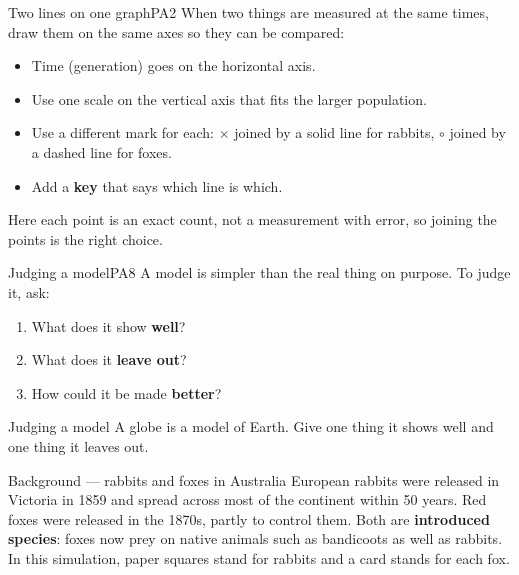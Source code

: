 
\begin{technique}{Two lines on one graph}{PA2}
When two things are measured at the same times, draw them on the same axes so they can be compared:
\begin{itemize}[leftmargin=1.4em, itemsep=1pt, topsep=3pt]
  \item Time (generation) goes on the horizontal axis.
  \item Use one scale on the vertical axis that fits the larger population.
  \item Use a different mark for each: $\times$ joined by a solid line for rabbits, $\circ$ joined by a dashed line for foxes.
  \item Add a \textbf{key} that says which line is which.
\end{itemize}
Here each point is an exact count, not a measurement with error, so joining the points is the right choice.
\end{technique}

\begin{technique}{Judging a model}{PA8}
A model is simpler than the real thing on purpose. To judge it, ask:
\begin{enumerate}[leftmargin=1.6em, itemsep=1pt, topsep=3pt]
  \item What does it show \textbf{well}?
  \item What does it \textbf{leave out}?
  \item How could it be made \textbf{better}?
\end{enumerate}
\end{technique}

\begin{wedo}{Judging a model}
A globe is a model of Earth. Give one thing it shows well and one thing it leaves out.
\answerbox{3cm}
\end{wedo}


\begin{readingbox}{Background --- rabbits and foxes in Australia}
European rabbits were released in Victoria in 1859 and spread across most of the continent within 50 years. Red foxes were released in the 1870s, partly to control them. Both are \textbf{introduced species}: foxes now prey on native animals such as bandicoots as well as rabbits. In this simulation, paper squares stand for rabbits and a card stands for each fox.
\end{readingbox}

